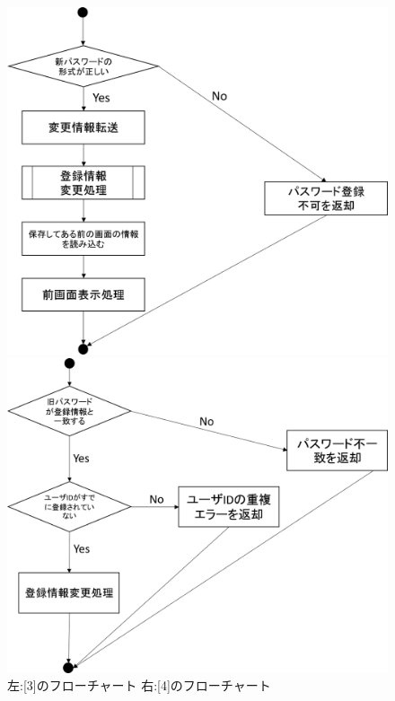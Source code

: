 \begin{figure}[htbp]
 \begin{minipage}{0.5\hsize}
  \begin{center}
   \includegraphics[width=1\linewidth,clip]{./img/edit_account/sub3.png}
  \end{center}
 \end{minipage}
 \begin{minipage}{0.5\hsize}
  \begin{center}
   \includegraphics[width=1\linewidth,clip]{./img/edit_account/sub4.png}
  \end{center}
 \end{minipage}
 \caption{左:[3]のフローチャート 右:[4]のフローチャート}\label{fig:editaccountflow0}
\end{figure}


